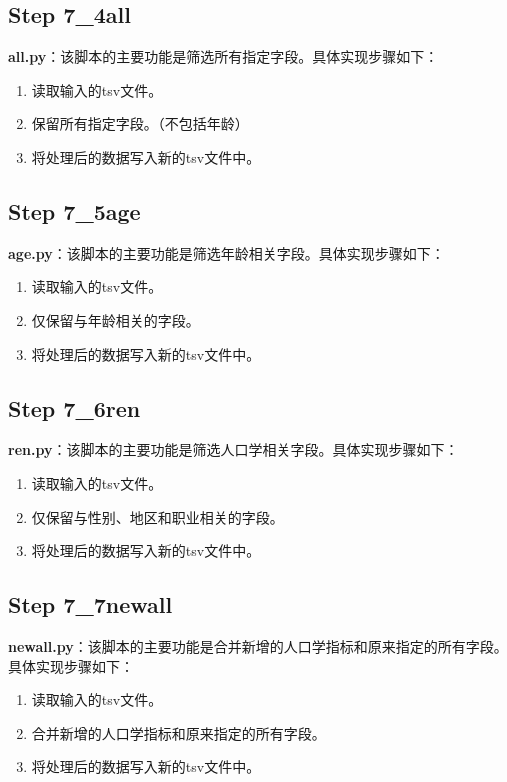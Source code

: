 \documentclass[UTF8]{report}
\theoremstyle{MyLineTheoremStyle} %
\theoremstyle{MyBlockTheoremStyle} %
\theoremstyle{MySubsubsectionStyle} %
\begin{document}
\subsection*{Step 7\_4all}

\textbf{all.py}：该脚本的主要功能是筛选所有指定字段。具体实现步骤如下：
\begin{enumerate}
    \item 读取输入的tsv文件。
    \item 保留所有指定字段。（不包括年龄）
    \item 将处理后的数据写入新的tsv文件中。
\end{enumerate}


\subsection*{Step 7\_5age}

\textbf{age.py}：该脚本的主要功能是筛选年龄相关字段。具体实现步骤如下：
\begin{enumerate}
    \item 读取输入的tsv文件。
    \item 仅保留与年龄相关的字段。
    \item 将处理后的数据写入新的tsv文件中。
\end{enumerate}


\subsection*{Step 7\_6ren}

\textbf{ren.py}：该脚本的主要功能是筛选人口学相关字段。具体实现步骤如下：
\begin{enumerate}
    \item 读取输入的tsv文件。
    \item 仅保留与性别、地区和职业相关的字段。
    \item 将处理后的数据写入新的tsv文件中。
\end{enumerate}

\subsection*{Step 7\_7newall}

\textbf{newall.py}：该脚本的主要功能是合并新增的人口学指标和原来指定的所有字段。具体实现步骤如下：
\begin{enumerate}
    \item 读取输入的tsv文件。
    \item 合并新增的人口学指标和原来指定的所有字段。
    \item 将处理后的数据写入新的tsv文件中。
\end{enumerate}
\end{document}

